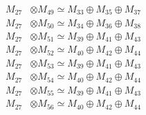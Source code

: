 \begin{align*}
M_{27} &\otimes M_{49} \simeq M_{33} \oplus M_{35} \oplus M_{37} \\
M_{27} &\otimes M_{50} \simeq M_{34} \oplus M_{36} \oplus M_{38} \\
M_{27} &\otimes M_{51} \simeq M_{39} \oplus M_{41} \oplus M_{43} \\
M_{27} &\otimes M_{52} \simeq M_{40} \oplus M_{42} \oplus M_{44} \\
M_{27} &\otimes M_{53} \simeq M_{39} \oplus M_{41} \oplus M_{43} \\
M_{27} &\otimes M_{54} \simeq M_{40} \oplus M_{42} \oplus M_{44} \\
M_{27} &\otimes M_{55} \simeq M_{39} \oplus M_{41} \oplus M_{43} \\
M_{27} &\otimes M_{56} \simeq M_{40} \oplus M_{42} \oplus M_{44} \\
\end{align*}

